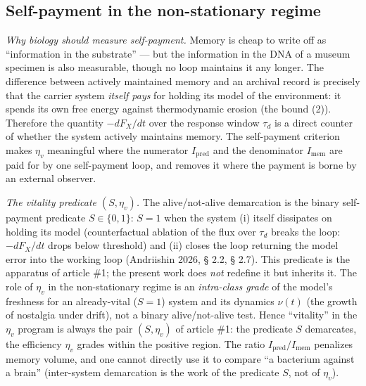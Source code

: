 \documentclass[pdflatex,sn-mathphys-ay]{sn-jnl}
\begin{document}
\subsection{Self-payment in the non-stationary regime}\label{self-payment-in-the-non-stationary-regime}



\emph{Why biology should measure self-payment.} Memory is cheap to write off as ``information in the substrate'' --- but the information in the DNA of a museum specimen is also measurable, though no loop maintains it any longer. The difference between actively maintained memory and an archival record is precisely that the carrier system \emph{itself pays} for holding its model of the environment: it spends its own free energy against thermodynamic erosion (the bound (2)). Therefore the quantity \(-dF_X/dt\) over the response window \(\tau_d\) is a direct counter of whether the system actively maintains memory. The self-payment criterion makes \(\eta_v\) meaningful where the numerator \(I_{\text{pred}}\) and the denominator \(I_{\text{mem}}\) are paid for by one self-payment loop, and removes it where the payment is borne by an external observer.



\emph{The vitality predicate \((S, \eta_v)\).} The alive/not-alive demarcation is the binary self-payment predicate \(S \in \{0,1\}\): \(S = 1\) when the system (i) itself dissipates on holding its model (counterfactual ablation of the flux over \(\tau_d\) breaks the loop: \(-dF_X/dt\) drops below threshold) and (ii) closes the loop returning the model error into the working loop (Andriishin 2026, § 2.2, § 2.7). This predicate is the apparatus of article \#1; the present work does \emph{not} redefine it but inherits it. The role of \(\eta_v\) in the non-stationary regime is an \emph{intra-class grade} of the model's freshness for an already-vital (\(S = 1\)) system and its dynamics \(\nu(t)\) (the growth of nostalgia under drift), not a binary alive/not-alive test. Hence ``vitality'' in the \(\eta_v\) program is always the pair \((S, \eta_v)\) of article \#1: the predicate \(S\) demarcates, the efficiency \(\eta_v\) grades within the positive region. The ratio \(I_{\text{pred}}/I_{\text{mem}}\) penalizes memory volume, and one cannot directly use it to compare ``a bacterium against a brain'' (inter-system demarcation is the work of the predicate \(S\), not of \(\eta_v\)).
\end{document}

